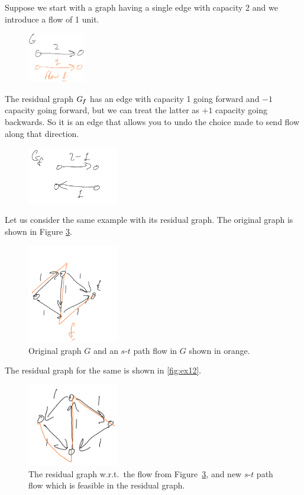 Suppose we start with a graph having a single edge with capacity 2 and we introduce a flow of 1 unit.
\begin{figure}[H]
 \centering
  \includegraphics[width=25mm,scale=0.6]{fig/fig9_lec10.PNG}
  \label{fig:ex9}
\end{figure}
The residual graph \(G_{\boldsymbol{\mathit{f}}}\) has an edge with capacity 1 going
forward and $-1$ capacity going forward, but we can treat the latter as $+1$
capacity going backwards. So it is an edge that allows you to undo the choice made to send flow along that direction.
\begin{figure}[H]
 \centering
  \includegraphics[width=40mm,scale=0.5]{fig/fig10_lec10.PNG}
  \label{fig:ex10}
\end{figure}
Let us consider the same example with its residual graph. The original graph is shown in Figure \ref{fig:ex11}.
\begin{figure}[H]
 \centering
  \includegraphics[width=40mm,scale=0.5]{fig/fig11_lec10.PNG}
  \caption{Original graph $G$ and an $s$-$t$ path flow in $G$ shown in
    orange.}
  \label{fig:ex11}
\end{figure}
The residual graph for the same is shown in \autoref{fig:ex12}.
\begin{figure}[H]
 \centering
  \includegraphics[width=40mm,scale=0.5]{fig/fig12_lec10.PNG}
  \caption{The residual graph w.r.t.\ the flow from
    Figure~\ref{fig:ex11}, and new $s$-$t$ path flow which is feasible
  in the residual graph.}\label{fig:ex12}
\end{figure}
